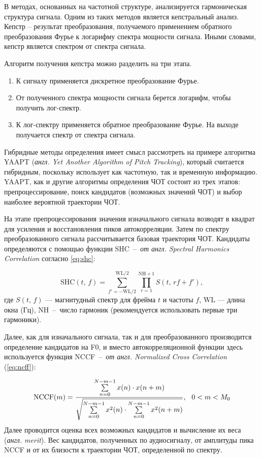 В методах, основанных на частотной структуре, анализируется гармоническая структура сигнала. Одним из таких методов является кепстральный анализ. Кепстр -- результат преобразования, получаемого применением обратного преобразования Фурье к логарифму спектра мощности сигнала. Иными словами, кепстр является спектром от спектра сигнала.

Алгоритм получения кепстра можно разделить на три этапа.
\begin{enumerate}
	\item К сигналу применяется дискретное преобразование Фурье.
	\item От полученного спектра мощности сигнала берется логарифм, чтобы получить лог-спектр.
	\item К лог-спектру применяется обратное преобразование Фурье. На выходе получается спектр от спектра сигнала.
\end{enumerate}

Гибридные методы определения  имеет смысл рассмотреть на примере алгоритма YAAPT (\textit{англ. Yet Another Algorithm of Pitch Tracking}), который считается гибридным, поскольку использует как частотную, так и временную информацию. YAAPT, как и другие алгоритмы определения ЧОТ состоит из трех этапов: препроцессирование, поиск кандидатов (возможных значений ЧОТ) и выбор наиболее вероятной траектории ЧОТ.

На этапе препроцессирования значения изначального сигнала возводят в квадрат для усиления и восстановления пиков автокорреляции. Затем по спектру преобразованного сигнала рассчитывается базовая траектория ЧОТ. Кандидаты определяются с помощью функции SHC~--~\textit{от англ. Spectral Harmonics Correlation} согласно \ref{eq:shc}:

\begin{equation}\label{eq:shc}
	\mathrm{SHC}(t,\,f) = \sum\limits_{f'=-\mathrm{WL}/2}^{\mathrm{WL}/2} \prod\limits_{r=1}^{\mathrm{NH}+1}S(t,\,rf+f'),
\end{equation}
где $S(t,\,f)$ — магнитудный спектр для фрейма $t$ и частоты $f$, $\mathrm{WL}$ — длина окна (Гц), $\mathrm{NH}$~--~число гармоник (рекомендуется \cite{yaapt} использовать первые три гармоники). 

Далее, как для изначального сигнала, так и для преобразованного производится определение кандидатов на F0, и вместо автокорреляционной функции здесь используется функция NCCF~--~\textit{от англ. Normalized Cross Correlation} (\ref{eq:ncff}):

\begin{equation}\label{eq:ncff}
	\mathrm{NCCF}(m) = \frac{\sum\limits_{n=0}^{N-m-1} x(n)\cdot x(n+m)}{\sqrt{\sum\limits_{n=0}^{N-m-1} x^2(n) \cdot \sum\limits_{n=0}^{N-m-1} x^2(n+m)}}\text{,} \hspace{0.3cm} 0 < m < M_{0}
\end{equation}
Далее проводится оценка всех возможных кандидатов и вычисление их веса (\textit{англ. merit}). Вес кандидатов, полученных по аудиосигналу, от амплитуды пика NCCF и от их близости к траектории ЧОТ, определенной по спектру.

